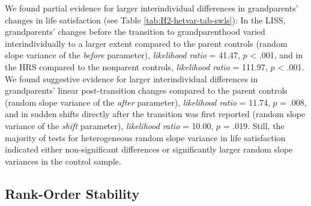 \documentclass[
  english,
  man, noextraspace]{apa7}
\begin{document}
We found partial evidence for larger interindividual differences in grandparents' changes in life satisfaction (see Table \ref{tab:H2-hetvar-tab-swls}): In the LISS, grandparents' changes before the transition to grandparenthood varied interindividually to a larger extent compared to the parent controls (random slope variance of the \emph{before} parameter), \emph{likelihood ratio} = 41.47, \(p\) \textless{} .001, and in the HRS compared to the nonparent controls, \emph{likelihood ratio} = 111.97, \(p\) \textless{} .001. We found suggestive evidence for larger interindividual differences in grandparents' linear post-transition changes compared to the parent controls (random slope variance of the \emph{after} parameter), \emph{likelihood ratio} = 11.74, \(p\) = .008, and in sudden shifts directly after the transition was first reported (random slope variance of the \emph{shift} parameter), \emph{likelihood ratio} = 10.00, \(p\) = .019. Still, the majority of tests for heterogeneous random slope variance in life satisfaction indicated either non-significant differences or significantly larger random slope variances in the control sample.

\hypertarget{rank-order-stability}{%
\subsection{Rank-Order Stability}\label{rank-order-stability}}
\end{document}
